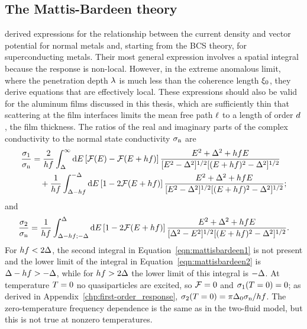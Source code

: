 \subsection{The Mattis-Bardeen theory}
\label{sec:theory.electrodynamics.mattis-bardeen}

\textcite{MattisBardeen1958PR} derived expressions for the relationship between the current density and vector potential for normal metals and, starting from the BCS theory, for superconducting metals.
Their most general expression involves a spatial integral because the response is non-local.
However, in the extreme anomalous limit, where the penetration depth $\lambda$ is much less than the coherence length $\xi_0$, they derive equations that are effectively local.
These expressions should also be valid for the aluminum films discussed in this thesis, which are sufficiently thin that scattering at the film interfaces limits the mean free path $\ell$ to a length of order $d$, the film thickness.
The ratios of the real and imaginary parts of the complex conductivity to the normal state conductivity $\sigma_{\mathrm{n}}$ are
\begin{align}
\begin{split}
\frac{\sigma_1}{\sigma_{\mathrm{n}}}
  &=
  \frac{2}{h f} \int_\Delta^\infty \dd{E}
  \left[ \mathcal{F}(E) - \mathcal{F}(E + h f) \right]
  \frac{E^2 + \Delta^2 + h f E}
  {[E^2 - \Delta^2]^{1/2} [(E + h f)^2 - \Delta^2]^{1/2}} \\
  &\quad +
  \frac{1}{h f} \int_{\Delta - h f}^{-\Delta} \dd{E}
  \left[ 1 - 2 \mathcal{F}(E + h f) \right]
  \frac{E^2 + \Delta^2 + h f E}
  {[E^2 - \Delta^2]^{1/2} [(E + h f)^2 - \Delta^2]^{1/2}};
\end{split}
\label{eqn:mattisbardeen1}
\end{align}
and
\begin{equation}
\frac{\sigma_2}{\sigma_{\mathrm{n}}}
  =
  \frac{1}{h f} \int_{\Delta - h f; -\Delta}^{\Delta} \dd{E}
  \left[ 1 - 2 \mathcal{F}(E + h f) \right]
  \frac{E^2 + \Delta^2 + h f E}
  {[\Delta^2 - E^2]^{1/2} [(E + h f)^2 - \Delta^2]^{1/2}}.
\label{eqn:mattisbardeen2}
\end{equation}
For $h f < 2 \Delta$, the second integral in Equation~\ref{eqn:mattisbardeen1} is not present and the lower limit of the integral in Equation~\ref{eqn:mattisbardeen2} is $\Delta - h f > -\Delta$, while for $h f > 2 \Delta$ the lower limit of this integral is $-\Delta$.
At temperature
$T = 0$
no quasiparticles are excited, so $\mathcal{F} = 0$ and $\sigma_1(T = 0) = 0$;
as derived in Appendix~\ref{chp:first-order_response},
$\sigma_2(T = 0) = \pi \Delta_0 \sigma_{\mathrm{n}} / h f$.
The zero-temperature frequency dependence is the same as in the two-fluid model, but this is not true at nonzero temperatures.


